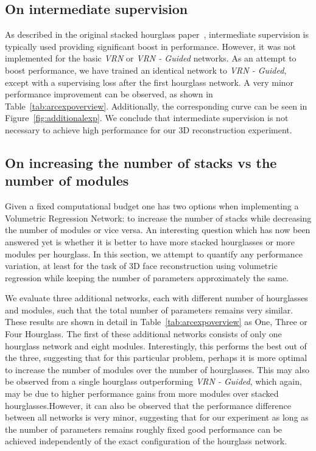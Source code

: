 \subsection{On intermediate supervision}
\label{sec:arc_intersup}

As described in the original stacked hourglass
paper~\cite{newell2016stacked}, intermediate supervision is typically
used providing significant boost in performance. However, it was not
implemented for the basic \textit{VRN} or \textit{VRN - Guided}
networks. As an attempt to boost performance, we have trained an
identical network to \textit{VRN - Guided}, except with a supervising
loss after the first hourglass network. A very minor performance
improvement can be observed, as shown in
Table~\ref{tab:arcexpoverview}. Additionally, the corresponding curve
can be seen in Figure~\ref{fig:additionalexp}. We conclude that
intermediate supervision is not necessary to achieve high performance
for our 3D reconstruction experiment.



\subsection{On increasing the number of stacks vs the number of modules}
\label{sec:arc_secvsmod}

Given a fixed computational budget one has two options when
implementing a Volumetric Regression Network: to increase the number
of stacks while decreasing the number of modules or vice versa.  An
interesting question which has now been answered yet is whether it is
better to have more stacked hourglasses or more modules per
hourglass. In this section, we attempt to quantify any performance
variation, at least for the task of 3D face reconstruction using
volumetric regression while keeping the number of parameters
approximately the same.

We evaluate three additional networks, each with different number of
hourglasses and modules, such that the total number of parameters
remains very similar. These results are shown in detail in
Table~\ref{tab:arcexpoverview} as One, Three or Four Hourglass. The
first of these additional networks consists of only one hourglass
network and eight modules. Interestingly, this performs the best out
of the three, suggesting that for this particular problem, perhaps it
is more optimal to increase the number of modules over the number of
hourglasses. This may also be observed from a single hourglass
outperforming \textit{VRN - Guided}, which again, may be due to higher
performance gains from more modules over stacked hourglasses.However,
it can also be observed that the performance difference between all
networks is very minor, suggesting that for our experiment as long as
the number of parameters remains roughly fixed good performance can be
achieved independently of the exact configuration of the hourglass
network.



